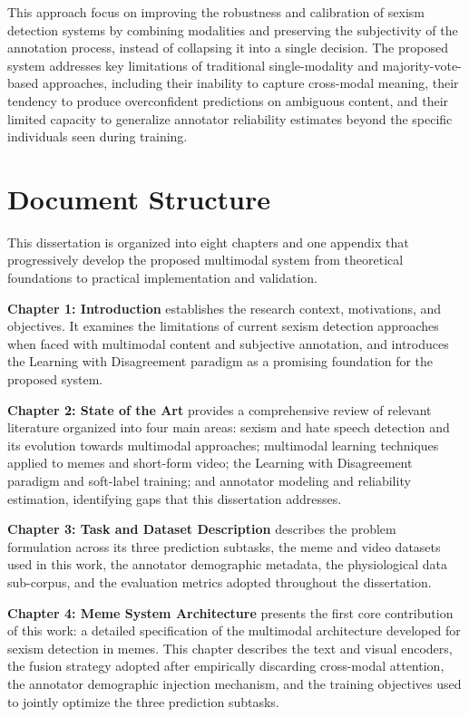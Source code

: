 This approach focus on improving the robustness and calibration of sexism detection systems
by combining modalities and preserving the subjectivity of the annotation
process, instead of collapsing it into a single decision. The proposed system addresses
key limitations of traditional single-modality and majority-vote-based approaches, including their inability to capture cross-modal meaning, their tendency to produce
overconfident predictions on ambiguous content, and their limited capacity to generalize annotator
reliability estimates beyond the specific individuals seen during training.
\section{Document Structure}\label{sec:document-structure}
This dissertation is organized into eight chapters and one appendix that progressively
develop the proposed multimodal system from theoretical foundations to practical
implementation and validation.

\textbf{Chapter 1: Introduction} establishes the research context, motivations, and
objectives. It examines the limitations of current sexism detection approaches when
faced with multimodal content and subjective annotation, and introduces the Learning
with Disagreement paradigm as a promising foundation for the proposed system.

\textbf{Chapter 2: State of the Art} provides a comprehensive review of relevant
literature organized into four main areas: sexism and hate speech detection and its
evolution towards multimodal approaches; multimodal learning techniques applied to
memes and short-form video; the Learning with Disagreement paradigm and soft-label
training; and annotator modeling and reliability estimation, identifying gaps that this
dissertation addresses.

\textbf{Chapter 3: Task and Dataset Description} describes the problem formulation
across its three prediction subtasks, the meme and video datasets used in this work, the
annotator demographic metadata, the physiological data sub-corpus, and the evaluation
metrics adopted throughout the dissertation.

\textbf{Chapter 4: Meme System Architecture} presents the first core contribution of
this work: a detailed specification of the multimodal architecture developed for sexism
detection in memes. This chapter describes the text and visual encoders, the fusion
strategy adopted after empirically discarding cross-modal attention, the annotator
demographic injection mechanism, and the training objectives used to jointly optimize
the three prediction subtasks.

